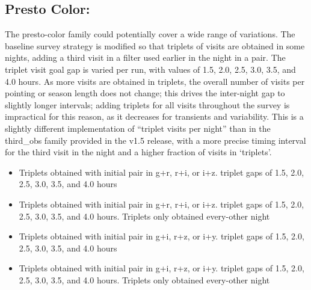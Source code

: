 \subsection{Presto Color:}
The presto-color family could potentially cover a wide range of variations. The baseline survey strategy is modified so that triplets of visits are obtained in some nights, adding a third visit in a filter used earlier in the night in a pair. The triplet visit goal gap is varied per run, with values of 1.5, 2.0, 2.5, 3.0, 3.5, and 4.0 hours. As more visits are obtained in triplets, the overall number of visits per pointing or season length does not change; this drives the inter-night gap to slightly longer intervals; adding triplets for all visits throughout the survey is impractical for this reason, as it decreases for transients and variability. This is a slightly different implementation of “triplet visits per night” than in the third\_obs family provided in the v1.5 release, with a more precise timing interval for the third visit in the night and a higher fraction of visits in ‘triplets’.
\begin{itemize}
\item Triplets obtained with initial pair in g+r, r+i, or i+z. triplet gaps of 1.5, 2.0, 2.5, 3.0, 3.5, and 4.0 hours
\item Triplets obtained with initial pair in g+r, r+i, or i+z. triplet gaps of 1.5, 2.0, 2.5, 3.0, 3.5, and 4.0 hours. Triplets only obtained every-other night
\item Triplets obtained with initial pair in g+i, r+z, or i+y. triplet gaps of 1.5, 2.0, 2.5, 3.0, 3.5, and 4.0 hours
\item Triplets obtained with initial pair in g+i, r+z, or i+y. triplet gaps of 1.5, 2.0, 2.5, 3.0, 3.5, and 4.0 hours. Triplets only obtained every-other night
\end{itemize}

